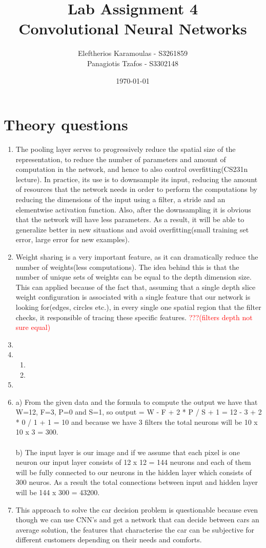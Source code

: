 \documentclass{article}
\title{Lab Assignment 4\\ {\Large Convolutional Neural Networks}}
\date{\today}
\author{
 	Eleftherios Karamoulas - S3261859\\ 
	Panagiotis Tzafos - S3302148\\
}
\begin{document}
\maketitle
\section{Theory questions}
\begin{enumerate}
\item The pooling layer serves to progressively reduce the spatial size of the representation, to reduce the number of parameters and amount of computation in the network, and hence to also control overfitting(CS231n lecture). In practice, its use is to downsample its input, reducing the amount of resources that the network needs in order to perform the computations by reducing the dimensions of the input using a filter, a stride and an elementwise activation function. Also, after the downsampling it is obvious that the network will have less parameters. As a result, it will be able to generalize better in new situations and avoid overfitting(small training set error, large error for new examples). 
\item
Weight sharing is a very important feature, as it can dramatically reduce the number of weights(less computations). The idea behind this is that the number of unique sets of weights can be equal to the depth dimension size. This can applied because of the fact that, assuming that a single depth slice weight configuration is associated with a single feature that our network is looking for(edges, circles etc.), in every single one spatial region that the filter checks, it responsible of tracing these specific features. \textcolor{red}{???(filters depth not sure equal)}
\item
\item
\begin{enumerate}
\item
\item
\end{enumerate}
\item
\item a) From the given data and the formula to compute the output we have that W=12, F=3, P=0 and S=1, so output = W - F + 2 * P / S + 1 = 12 - 3 + 2 * 0 / 1 + 1 =  10 and because we have 3 filters the total neurons will be 10 x 10 x 3 = 300.\\
\\
b) The input layer is our image and if we assume that  each pixel is one neuron our input layer consists of 12 x 12 = 144 neurons and each of them will be fully connected to our neurons in the hidden layer which consists of 300 neuros. As a result the total connections between input and hidden layer will be 144 x 300 = 43200.
\item This approach to solve the car decision problem is questionable because even though we can use CNN's and get a network that can decide between cars an average solution, the features that characterise the car can be subjective for different customers depending on their needs and comforts.
\end{enumerate}
\end{document}
